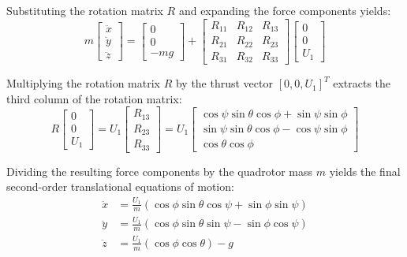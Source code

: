 Substituting the rotation matrix $R$ and expanding the force components yields:
\begin{equation}
m \begin{bmatrix} \ddot{x} \\ \ddot{y} \\ \ddot{z} \end{bmatrix} = \begin{bmatrix} 0 \\ 0 \\ -mg \end{bmatrix} + \begin{bmatrix} R_{11} & R_{12} & R_{13} \\ R_{21} & R_{22} & R_{23} \\ R_{31} & R_{32} & R_{33} \end{bmatrix} \begin{bmatrix} 0 \\ 0 \\ U_1 \end{bmatrix}
\end{equation}

Multiplying the rotation matrix $R$ by the thrust vector $[0, 0, U_1]^T$ extracts the third column of the rotation matrix:
\begin{equation}
R \begin{bmatrix} 0 \\ 0 \\ U_1 \end{bmatrix} = U_1 \begin{bmatrix} R_{13} \\ R_{23} \\ R_{33} \end{bmatrix} = U_1 \begin{bmatrix} \cos\psi\sin\theta\cos\phi + \sin\psi\sin\phi \\ \sin\psi\sin\theta\cos\phi - \cos\psi\sin\phi \\ \cos\theta\cos\phi \end{bmatrix}
\end{equation}

Dividing the resulting force components by the quadrotor mass $m$ yields the final second-order translational equations of motion:
\begin{align}
\ddot{x} &= \frac{U_1}{m} (\cos\phi \sin\theta \cos\psi + \sin\phi \sin\psi) \\
\ddot{y} &= \frac{U_1}{m} (\cos\phi \sin\theta \sin\psi - \sin\phi \cos\psi) \\
\ddot{z} &= \frac{U_1}{m} (\cos\phi \cos\theta) - g
\end{align}


